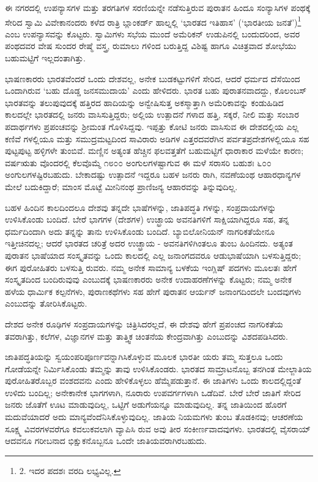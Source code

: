 ಈ ನಗರದಲ್ಲಿ ಉಪನ್ಯಾಸಗಳ ಮತ್ತು ತರಗತಿಗಳ ಸರಣಿಯನ್ನೇ ನಡೆಸುತ್ತಿರುವ ಪುರಾತನ ಹಿಂದೂ ಸಂನ್ಯಾಸಿಗಳ ಪಂಥಕ್ಕೆ ಸೇರಿದ ಸ್ವಾಮಿ ವಿವೇಕಾನಂದರು ಕಳೆದ ರಾತ್ರಿ ಬ್ಲಾಂಕರ್ಡ್ ಹಾಲ್ನಲ್ಲಿ ‘ಭಾರತದ ಇತಿಹಾಸ’ (‘ಭಾರತೀಯ ಜನತೆ’)\footnote{2. ಇದರ ಪದಶಃ ವರದಿ ಲಭ್ಯವಿಲ್ಲ.} ಎಂಬ ಉಪನ್ಯಾಸವನ್ನು ಕೊಟ್ಟರು. ಸ್ವಾಮಿಗಳು ಸಭೆಯ ಮುಂದೆ ಅಮೆರಿಕನ್ ಉಡುಪಿನಲ್ಲಿ ಬಂದುದರಿಂದ, ಅವರ ಪಂಥದವರ ವೇಷ ಸುಂದರ ರೇಷ್ಮೆ ವಸ್ತ್ರ, ರುಮಾಲು ಗಳಿಂದ ಬರುತ್ತಿದ್ದ ವಿಶಿಷ್ಟ ಹಾಗೂ ವಿಚಿತ್ರವಾದ ಶೋಭೆಯು ಬಹುಮಟ್ಟಿಗೆ ಇಲ್ಲದಂತಾಗಿತ್ತು.

ಭಾಷಣಕಾರರು ಭಾರತವೆಂದರೆ ಒಂದು ದೇಶವಲ್ಲ, ಅನೇಕ ಬುಡಕಟ್ಟುಗಳಿಗೆ ಸೇರಿದ, ಆದರೆ ಧರ್ಮದ ದೆಸೆಯಿಂದ ಒಂದಾಗಿರುವ ‘ಬಹು ದೊಡ್ಡ ಜನಸಮುದಾಯ’ ಎಂದು ಹೇಳಿದರು. ಭಾರತ ಬಹು ಪುರಾತನವಾದದ್ದು, ಕೊಲಂಬಸ್ ಭಾರತವನ್ನು ತಲುಪುವುದಕ್ಕೆ ಹತ್ತಿರದ ಹಾದಿಯನ್ನು ಅನ್ವೇಷಿಸುತ್ತ ಅಕಸ್ಮಾತ್ತಾಗಿ ಅಮೆರಿಕಾವನ್ನು ಕಂಡುಹಿಡಿದ ಕಾಲದಲ್ಲೇ ಭಾರತದಲ್ಲಿ ಜನರು ವಾಸಿಸುತ್ತಿದ್ದರು; ಅಲ್ಲಿಯ ಉತ್ಪಾದನೆ ಗಳಾದ ಹತ್ತಿ, ಸಕ್ಕರೆ, ನೀಲಿ ಮತ್ತು ಸಂಬಾರ ಪದಾರ್ಥಗಳು ಪ್ರಪಂಚವನ್ನು ಶ‍್ರೀಮಂತ ಗೊಳಿಸಿದ್ದವು. ಇಪ್ಪತ್ತು ಕೋಟಿ ಜನರು ವಾಸಿಸುವ ಈ ದೇಶದಲ್ಲಿಯ ಎಲ್ಲ ಕಣಿವೆ ಗಳಲ್ಲಿಯೂ ಮತ್ತು ಸಮುದ್ರಮಟ್ಟದಿಂದ ಸಾವಿರಾರು ಅಡಿಗಳ ಎತ್ತರದವರೆಗಿನ ಪರ್ವತಪ್ರದೇಶಗಳಲ್ಲಿಯೂ ಸಹ ಪುಟ್ಟಪುಟ್ಟ ಹಳ್ಳಿಗಳೇ ತುಂಬಿವೆ. ಮಣ್ಣಿನ ಅತ್ಯಂತ ಹೆಚ್ಚಿನ ಫಲವತ್ತತೆಗೆ ಬಹುಮಟ್ಟಿಗೆ ಧಾರಾಕಾರ ಮಳೆಯೇ ಕಾರಣ; ವರ್ಷಋತು ವೊಂದರಲ್ಲಿ ಕೆಲವೊಮ್ಮೆ ೧೮೦೦ ಅಂಗುಲಗಳಷ್ಟಾಗುವ ಈ ಮಳೆ ಸರಾಸರಿ ಬಹುಶಃ ೬೦೦ ಅಂಗುಲಗಳಷ್ಟಿರಬಹುದು. ಬೇಕಾದಷ್ಟು ಉತ್ಪಾದನೆ ಇದ್ದರೂ ಬಹಳ ಜನರು ರಾಗಿ, ನವಣೆಯಂಥ ಆಹಾರಧಾನ್ಯಗಳ ಮೇಲೆ ಬದುಕಿದ್ದಾರೆ; ಮಾಂಸ ಮೊಟ್ಟೆ ಮೀನಿನಂಥ ಪ್ರಾಣಿಜನ್ಯ ಆಹಾರವನ್ನು ತಿನ್ನುವುದಿಲ್ಲ.

ಬಹಳ ಹಿಂದಿನ ಕಾಲದಿಂದಲೂ ದೇಶವು ತನ್ನದೇ ಭಾಷೆಗಳನ್ನು, ಜಾತಿಪದ್ಧತಿ ಗಳನ್ನು, ಸಂಪ್ರದಾಯಗಳನ್ನು ಉಳಿಸಿಕೊಂಡು ಬಂದಿದೆ. ಬೇರೆ ಭಾಗಗಳ (ದೇಶಗಳ) ಉಚ್ಛ್ರಾಯ ಅವನತಿಗಳಿಗೆ ಸಾಕ್ಷಿಯಾಗಿದ್ದರೂ ಸಹ, ತನ್ನ ಧರ್ಮದಿಂದಾಗಿ ಅದು ತನ್ನನ್ನು ತಾನು ಉಳಿಸಿಕೊಂಡು ಬಂದಿದೆ. ಬ್ಯಾಬಿಲೋನಿಯನ್ ನಾಗರಿಕತೆಯೇನೂ ಇತ್ತೀಚಿನದಲ್ಲ; ಆದರೆ ಭಾರತದ ಚರಿತ್ರೆ ಅದರ ಉಚ್ಛ್ರಾಯ - ಅವನತಿಗಳಿಗಿಂತಲೂ ತುಂಬ ಹಿಂದಿನದು. ಅತ್ಯಂತ ಪುರಾತನ ಭಾಷೆಯಾದ ಸಂಸ್ಕೃತವನ್ನು ಒಂದು ಕಾಲದಲ್ಲಿ ಎಲ್ಲ ಜನಾಂಗದವರೂ ಆಡುಭಾಷೆಯಾಗಿ ಬಳಸುತ್ತಿದ್ದರು; ಈಗ ಪುರೋಹಿತರು ಬಳಸುತ್ತಿ ರುವರು. ನಮ್ಮ ಅನೇಕ ಸಾಮಾನ್ಯ ಬಳಕೆಯ ಇಂಗ್ಲಿಷ್ ಪದಗಳು ಮೂಲತಃ ಹೇಗೆ ಸಂಸ್ಕೃತದಿಂದ ಬಂದಿರುವುವು ಎಂಬುದಕ್ಕೆ ಭಾಷಣಕಾರರು ಅನೇಕ ಉದಾಹರಣೆಗಳನ್ನು ಕೊಟ್ಟರು; ನಮ್ಮ ಅನೇಕ ಹಳೆಯ ಧಾರ್ಮಿಕ ಕಲ್ಪನೆಗಳು, ಪುರಾಣಕಥೆಗಳು ಸಹ ಹೇಗೆ ಪುರಾತನ ಆರ್ಯನ್ ಜನಾಂಗದಿಂದಲೇ ಬಂದವುಗಳು ಎಂಬುದನ್ನು ತೋರಿಸಿಕೊಟ್ಟರು.

ದೇಶದ ಅನೇಕ ರೂಢಿಗಳ ಸಂಪ್ರದಾಯಗಳನ್ನು ಚಿತ್ರಿಸಿದರಲ್ಲದೆ, ಈ ದೇಶವು ಹೇಗೆ ಪ್ರಪಂಚದ ನಾಗರಿಕತೆಯ ತವರಾಗಿತ್ತು, ಕಲೆಗಳ, ವಿಜ್ಞಾನಗಳ ಮತ್ತು ತಾತ್ತ್ವಿಕ ಚಿಂತನೆಯ ಕೇಂದ್ರವಾಗಿತ್ತು ಎಂಬುದನ್ನು ವಿಶದಪಡಿಸಿದರು.

ಜಾತಿಪದ್ಧತಿಯನ್ನು ಸ್ವಯಂಪರಿಪೂರ್ಣವನ್ನಾಗಿಸಿಕೊಳ್ಳುವ ಮೂಲಕ ಭಾರತೀ ಯರು ತಮ್ಮ ಸುತ್ತಲೂ ಒಂದು ಗೋಡೆಯನ್ನೇ ನಿರ್ಮಿಸಿಕೊಂಡು ತಮ್ಮನ್ನು ತಾವು ಉಳಿಸಿಕೊಂಡರು. ಭಾರತದ ಸಾಮ್ರಾಟನೊಬ್ಬ ತನಗಿಂತ ಮೇಲ್ಜಾತಿಯ ಪುರೋಹಿತರೊಬ್ಬರ ವಂಶದವನು ಎಂದು ಹೇಳಿಕೊಳ್ಳಲು ಹೆಮ್ಮೆಪಡುತ್ತಾನೆ. ಈ ಜಾತಿಗಳು ಒಂದು ಕಾಲದಲ್ಲಿದ್ದಂತೆ ಉಳಿದು ಬಂದಿಲ್ಲ; ಅನೇಕಾನೇಕ ಭಾಗಗಳಾಗಿ, ನೂರಾರು ಉಪವರ್ಗಗಳಾಗಿ ಒಡೆದಿವೆ. ಬೇರೆ ಬೇರೆ ಜಾತಿಗೆ ಸೇರಿದ ಜನರು ಜೊತೆಗೆ ಊಟ ಮಾಡುವುದಿಲ್ಲ, ಒಟ್ಟಿಗೆ ಅಡುಗೆಯನ್ನೂ ಮಾಡುವುದಿಲ್ಲ. ತನ್ನ ಜಾತಿಯಿಂದ ಹೊರಗೆ ಮದುವೆಯಾದರೆ ಅದು ಮಾನ್ಯವೆಂದೆನಿಸಿಕೊಳ್ಳುವುದಿಲ್ಲ. ಜಾತಿಯ ನಿಯಮಗಳು ತುಂಬ ತೊಡಕಿನವು; ಆಚರಣೆಯ ಸೂಕ್ಷ್ಮ ವಿವರಗಳವರೆಗೂ ಕವಲುಕವಲಾಗಿ ವ್ಯಾಪಿಸಿ ರುವ ಅವು ತೀರ ಸಂಕೀರ್ಣವಾದವುಗಳು. ಭಾರತದಲ್ಲಿ ವೈಸರಾಯ್​ ಆದವನೂ ಗರೀಬನಾದ ಭಿಕ್ಷುಕನೊಬ್ಬನೂ ಒಂದೇ ಜಾತಿಯವರಾಗಿರಬಹುದು.


